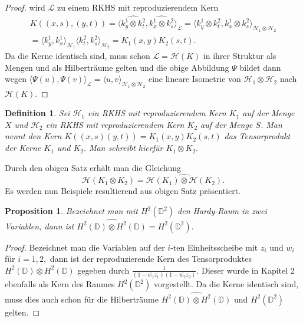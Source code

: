 \documentclass[12pt,titlepage,twoside,cleardoublepage]{article}
\theoremstyle{nummermitklammern}
\newtheorem{definition}[temp]{Definition}
\newtheorem{definition}[zahl]{Definition}
\numberwithin{equation}{section}
\newtheorem{proposition}[zahl]{Proposition}
\begin{document}
\begin{proof}
wird $\mathcal{L}$ zu einem RKHS mit reproduzierendem Kern 
\begin{align*}
K((x,s),(y,t))
=\langle \widehat{k^1_y \otimes k^2_t},\widehat{k^1_x \otimes k^2_s} \rangle_{\mathcal{L}}
=\langle k^1_y \otimes k_t^2,k^1_x \otimes k^2_s \rangle_{\mathcal{H}_1 \otimes \mathcal{H}_2
}\\
=\langle k_y^1,k^1_x\rangle_{\mathcal{H}_1}
\langle k_t^2,k^2_s\rangle_{\mathcal{H}_2}
=K_1(x,y)K_2(s,t).
\end{align*}
Da die Kerne identisch sind, muss schon $\mathcal{L}=\mathcal{H}(K)$ in ihrer Struktur als Mengen und als Hilberträume gelten und die obige Abbildung $\Psi$ bildet dann wegen $\langle \Psi(u),\Psi(v)\rangle_{\mathcal{L}}=\langle u,v\rangle_{\mathcal{H}_1\otimes \mathcal{H}_2}$ eine lineare Isometrie von $\mathcal{H}_1\otimes \mathcal{H}_2$ nach $\mathcal{H}(K)$.
\end{proof}
\begin{definition}
Sei $\mathcal{H}_1$ ein RKHS mit reproduzierendem Kern $K_1$ auf der Menge $X$ und $\mathcal{H}_2$ ein RKHS mit reproduzierendem Kern $K_2$ auf der Menge $S$.
Man nennt den Kern $K((x,s)(y,t))=K_1(x,y)K_2(s,t)$ das \emph{Tensorprodukt} der Kerne $K_1$ und $K_2.$ Man schreibt hierfür  $K_1 \otimes K_2.$
\end{definition}
Durch den obigen Satz erhält man die Gleichung 
\[
\mathcal{H}(K_1\otimes K_2)=\widehat{\mathcal{H}(K_1)\otimes\mathcal{H}(K_2)}.
\] 
Es werden nun Beispiele resultierend aus obigen Satz präsentiert.
\begin{proposition}
Bezeichnet man mit $H^2(\mathbb{D}^2)$ den Hardy-Raum in zwei Variablen, dann ist $\widehat{H^2(\mathbb{D}) \otimes H^2(\mathbb{D})}=H^2(\mathbb{D}^2).$ 
\end{proposition}
\begin{proof}
Bezeichnet man die Variablen auf der $i$-ten Einheitsscheibe mit $z_i$ und $w_i$ für $i=1,2,$ dann ist der reproduzierende Kern des Tensorproduktes $H^2(\mathbb{D})\otimes H^2(\mathbb{D})$ gegeben durch $\frac{1}{(1-\overline{w_1}z_1)(1-\overline{w_2}z_2)}.$ Dieser wurde in Kapitel 2 ebenfalls als Kern des Raumes $H^2(\mathbb{D}^2)$ vorgestellt. Da die Kerne identisch sind, muss dies auch schon für die Hilberträume $\widehat{H^2(\mathbb{D})\otimes H^2(\mathbb{D})}$ und $H^2(\mathbb{D}^2)$ gelten.
\end{proof}
\end{document}
